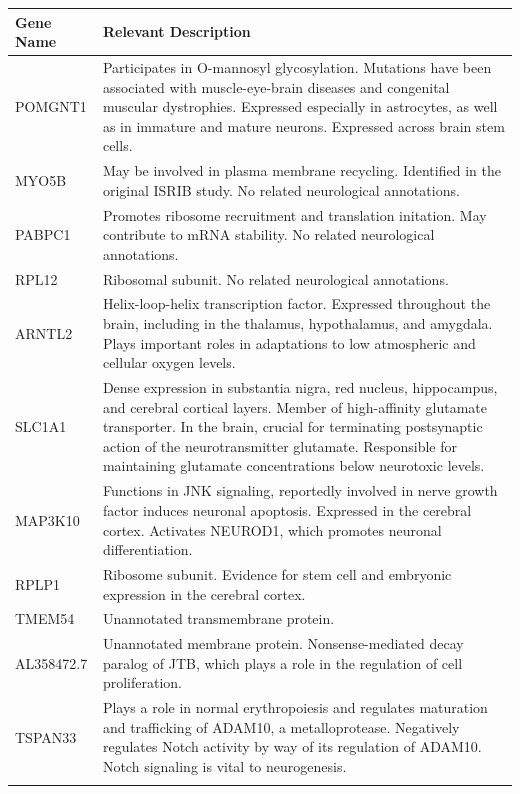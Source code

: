 \documentclass[11pt, a4paper, oneside]{article}
\begin{document}
\begin{tabular}{p{2.5cm}p{15.5cm}}
 \textbf{Gene Name} & \textbf{Relevant Description} \\
 \hline
 POMGNT1 & Participates in O-mannosyl glycosylation. Mutations have been associated with muscle-eye-brain diseases and congenital muscular dystrophies. Expressed especially in astrocytes, as well as in immature and mature neurons. Expressed across brain stem cells. \\
 \hline
 MYO5B & May be involved in plasma membrane recycling. Identified in the original ISRIB study. No related neurological annotations. \\
 \hline
 PABPC1 & Promotes ribosome recruitment and translation initation. May contribute to mRNA stability. No related neurological annotations. \\
 \hline
 RPL12 & Ribosomal subunit. No related neurological annotations. \\
 \hline
 ARNTL2 & Helix-loop-helix transcription factor. Expressed throughout the brain, including in the thalamus, hypothalamus, and amygdala. Plays important roles in adaptations to low atmospheric and cellular oxygen levels. \\
 \hline
 SLC1A1 & Dense expression in substantia nigra, red nucleus, hippocampus, and cerebral cortical layers. Member of high-affinity glutamate transporter. In the brain, crucial for terminating postsynaptic action of the neurotransmitter glutamate. Responsible for maintaining glutamate concentrations below neurotoxic levels. \\
 \hline
 MAP3K10 & Functions in JNK signaling, reportedly involved in nerve growth factor induces neuronal apoptosis. Expressed in the cerebral cortex. Activates NEUROD1, which promotes neuronal differentiation. \\
 \hline
 RPLP1 & Ribosome subunit. Evidence for stem cell and embryonic expression in the cerebral cortex. \\
 \hline
 TMEM54 & Unannotated transmembrane protein. \\
 \hline
 AL358472.7 & Unannotated membrane protein. Nonsense-mediated decay paralog of JTB, which plays a role in the regulation of cell proliferation. \\
 \hline
 TSPAN33 & Plays a role in normal erythropoiesis and regulates maturation and trafficking of ADAM10, a metalloprotease. Negatively regulates Notch activity by way of its regulation of ADAM10. Notch signaling is vital to neurogenesis. \\
 \label{tab:targets}
\end{tabular}
\newline
\end{document}

